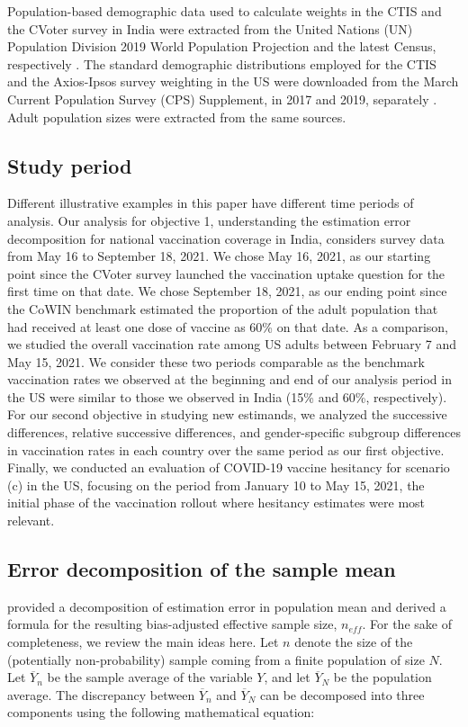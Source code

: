 \documentclass{article}
\begin{document}
Population-based demographic data used to calculate weights in the CTIS and the CVoter survey in India were extracted from the United Nations (UN) Population Division 2019 World Population Projection and the latest Census, respectively \citep{UN2019, IndianCensus2011}. The standard demographic distributions employed for the CTIS and the Axios-Ipsos survey weighting in the US were downloaded from the March Current Population Survey (CPS) Supplement, in 2017 and 2019, separately \citep{CPS2017, CPS2019}. Adult population sizes were extracted from the same sources.

\subsection{Study period}

Different illustrative examples in this paper have different time periods of analysis. Our analysis for objective 1, understanding the estimation error decomposition for national vaccination coverage in India, considers survey data from May 16 to September 18, 2021. We chose May 16, 2021, as our starting point since the CVoter survey launched the vaccination uptake question for the first time on that date. We chose September 18, 2021, as our ending point since the CoWIN benchmark estimated the proportion of the adult population that had received at least one dose of vaccine as 60\% on that date. As a comparison, we studied the overall vaccination rate among US adults between February 7 and May 15, 2021. We consider these two periods comparable as the benchmark vaccination rates we observed at the beginning and end of our analysis period in the US were similar to those we observed in India (15\% and 60\%, respectively). For our second objective in studying new estimands, we analyzed the successive differences, relative successive differences, and gender-specific subgroup differences in vaccination rates in each country over the same period as our first objective. Finally, we conducted an evaluation of COVID-19 vaccine hesitancy for scenario (c) in the US, focusing on the period from January 10 to May 15, 2021, the initial phase of the vaccination rollout where hesitancy estimates were most relevant.

\subsection{Error decomposition of the sample mean}

\cite{Meng2018} provided a decomposition of estimation error in population mean and derived a formula for the resulting bias-adjusted effective sample size, $n_{eff}$. For the sake of completeness, we review the main ideas here. Let $n$ denote the size of the (potentially non-probability) sample coming from a finite population of size $N$. Let $\overline{Y}_n$ be the sample average of the variable $Y$, and let $\overline{Y}_N$ be the population average. The discrepancy between $\overline{Y}_n$ and $\overline{Y}_N$ can be decomposed into three components using the following mathematical equation:
\end{document}
